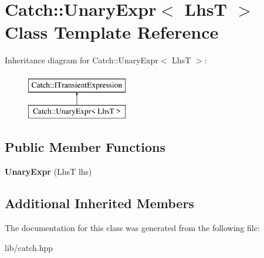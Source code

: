 \hypertarget{class_catch_1_1_unary_expr}{}\section{Catch\+:\+:Unary\+Expr$<$ LhsT $>$ Class Template Reference}
\label{class_catch_1_1_unary_expr}
Inheritance diagram for Catch\+:\+:Unary\+Expr$<$ LhsT $>$\+:\begin{figure}[H]
\begin{center}
\leavevmode
\includegraphics[height=2.000000cm]{class_catch_1_1_unary_expr}
\end{center}
\end{figure}
\subsection*{Public Member Functions}
\begin{DoxyCompactItemize}
\item 
\mbox{\label{class_catch_1_1_unary_expr_ae02f666a1e64da728628aa2033e1d6e7}} 
{\bfseries Unary\+Expr} (LhsT lhs)
\end{DoxyCompactItemize}
\subsection*{Additional Inherited Members}


The documentation for this class was generated from the following file\+:\begin{DoxyCompactItemize}
\item 
lib/catch.\+hpp\end{DoxyCompactItemize}

